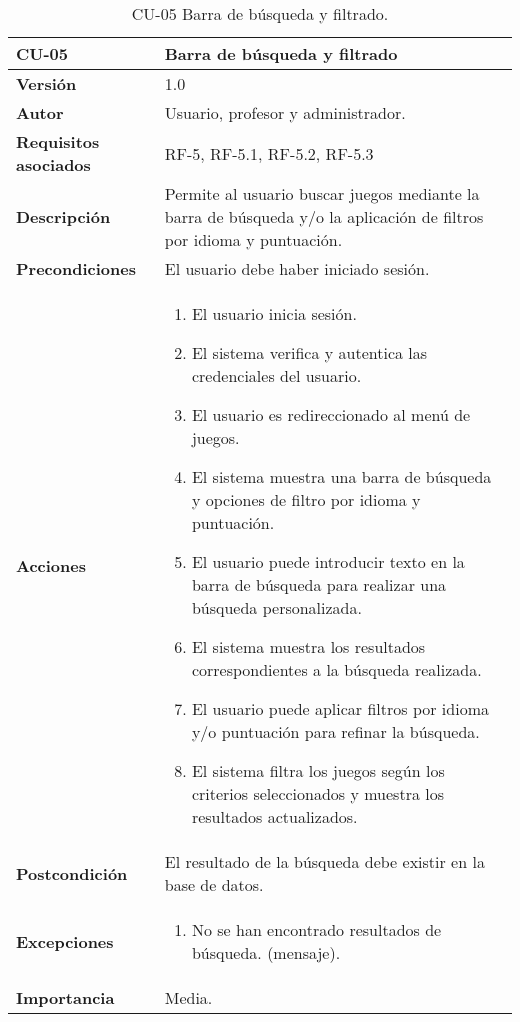 \begin{table}[p]
	\centering
	\begin{tabularx}{\linewidth}{ p{} p{} }
		\toprule
		\textbf{CU-05}    & \textbf{Barra de búsqueda y filtrado}\\
		\toprule
		\textbf{Versión}              & 1.0    \\
		\textbf{Autor}                & Usuario, profesor y administrador. \\
		\textbf{Requisitos asociados} & RF-5, RF-5.1, RF-5.2, RF-5.3 \\
		\textbf{Descripción}          & Permite al usuario buscar juegos mediante la barra de búsqueda y/o la aplicación de filtros por idioma y puntuación.\\
		\textbf{Precondiciones}         & El usuario debe haber iniciado sesión. \\
		\textbf{Acciones}             &
		\begin{enumerate}
			\def\labelenumi{\arabic{enumi}.}
			\tightlist
			\item El usuario inicia sesión.
            \item El sistema verifica y autentica las credenciales del usuario.
            \item El usuario es redireccionado al menú de juegos.
            \item El sistema muestra una barra de búsqueda y opciones de filtro por idioma y puntuación.
            \item El usuario puede introducir texto en la barra de búsqueda para realizar una búsqueda personalizada.
            \item El sistema muestra los resultados correspondientes a la búsqueda realizada.
            \item El usuario puede aplicar filtros por idioma y/o puntuación para refinar la búsqueda.
            \item El sistema filtra los juegos según los criterios seleccionados y muestra los resultados actualizados.
		\end{enumerate}\\
         \textbf{Postcondición}             & El resultado de la búsqueda debe existir en la base de datos. \\
		\textbf{Excepciones}             &
		\begin{enumerate}
			\def\labelenumi{\arabic{enumi}.}
			\tightlist
			\item No se han encontrado resultados de búsqueda. (mensaje).
		\end{enumerate}\\
		\textbf{Importancia}          & Media. \\
		\bottomrule
	\end{tabularx}
	\caption{CU-05 Barra de búsqueda y filtrado.}
\end{table}

